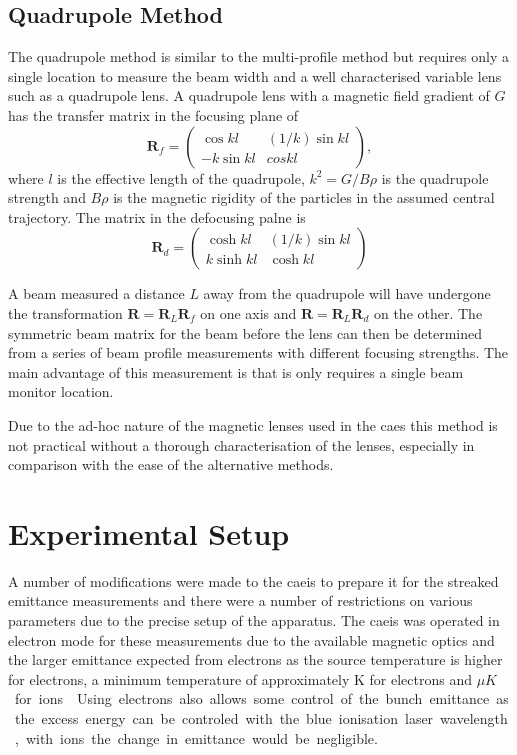 \subsection{Quadrupole Method}

The quadrupole method is similar to the multi-profile method but requires only a single location to measure the beam width and a well characterised variable lens such as a quadrupole lens.
A quadrupole lens with a magnetic field gradient of $G$ has the transfer matrix in the focusing plane of
\begin{equation}
\mathbf{R}_f = \begin{pmatrix} \cos kl & (1/k)\sin kl\\
-k\sin kl & cos kl\end{pmatrix},
\end{equation}
where $l$ is the effective length of the quadrupole, $k^2=G/B\rho$ is the quadrupole strength and $B\rho$ is the magnetic rigidity of the particles in the assumed central trajectory.
The matrix in the defocusing palne is
\begin{equation}
\mathbf{R}_d = \begin{pmatrix} \cosh kl & (1/k) \sin kl\\
k \sinh kl & \cosh kl \end{pmatrix}
\end{equation}

A beam measured a distance $L$ away from the quadrupole will have undergone the transformation $\mathbf{R}=\mathbf{R}_L\mathbf{R}_f$ on one axis and $\mathbf{R}=\mathbf{R}_L\mathbf{R}_d$ on the other.
The symmetric beam matrix for the beam before the lens can then be determined from a series of beam profile measurements with different focusing strengths.
The main advantage of this measurement is that is only requires a single beam monitor location.

Due to the ad-hoc nature of the magnetic lenses used in the \gls{caes} this method is not practical without a thorough characterisation of the lenses, especially in comparison with the ease of the alternative methods.

\section{Experimental Setup}

A number of modifications were made to the \gls{caeis} to prepare it for the streaked emittance measurements and there were a number of restrictions on various parameters due to the precise setup of the apparatus.
The \gls{caeis} was operated in electron mode for these measurements due to the available magnetic optics and the larger emittance expected from electrons as the source temperature is higher for electrons, a minimum temperature of approximately \unit[10]{K} for electrons and \unit[100]{$\mu K$} for ions~\cite{saliba_spatial_2012}.
Using electrons also allows some control of the bunch emittance as the excess energy can be controled with the blue ionisation laser wavelength, with ions the change in emittance would be negligible.

